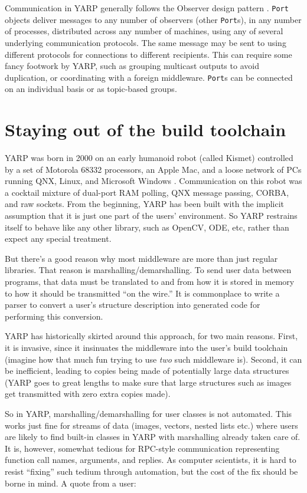 \documentclass[letterpaper]{article}
\begin{document}
Communication in YARP generally follows the Observer design pattern
\cite{gamma95design}. {\tt Port} objects deliver messages to any
number of observers (other {\tt Port}s), in any number of processes,
distributed across any number of machines, using any of several
underlying communication protocols.  The same message may be sent to
using different protocols for connections to different recipients.
This can require some fancy footwork by YARP, such as grouping
multicast outputs to avoid duplication, or coordinating with a foreign
middleware.  {\tt Port}s can be connected on an individual basis or as
topic-based groups.

\section{Staying out of the build toolchain}

YARP was born in 2000 on an early humanoid robot (called Kismet)
controlled by a set of Motorola 68332 processors, an Apple Mac, and a
loose network of PCs running QNX, Linux, and Microsoft Windows
\cite{metta06yarp}.  Communication on this robot was a cocktail
mixture of dual-port RAM polling, QNX message passing, CORBA, and raw
sockets.  From the beginning, YARP has been built with the implicit
assumption that it is just one part of the users' environment.  So
YARP restrains itself to behave like any other library, such as
OpenCV, ODE, etc, rather than expect any special treatment.

But there's a good reason why most middleware are more than just
regular libraries.  That reason is marshalling/demarshalling.  To send
user data between programs, that data must be translated to and from
how it is stored in memory to how it should be transmitted ``on the
wire.''  It is commonplace to write a parser to convert a user's
structure description into generated code for performing this
conversion.

YARP has historically skirted around this approach, for two main
reasons.  First, it is invasive, since it insinuates the middleware
into the user's build toolchain (imagine how that much fun trying to
use {\it two} such middleware is).  Second, it can be inefficient,
leading to copies being made of potentially large data structures
(YARP goes to great lengths to make sure that large structures such
as images get transmitted with zero extra copies made).

So in YARP, marshalling/demarshalling for user classes
is not automated.  This works
just fine for streams of data (images, vectors, nested lists etc.)
where users are likely to find built-in classes in YARP with
marshalling already taken care of.  It is, however, somewhat tedious
for RPC-style communication representing function call names,
arguments, and replies.  As computer scientists, it is hard to
resist ``fixing'' such tedium through automation, but the cost
of the fix should be borne in mind.  A quote from a user:
\end{document}
